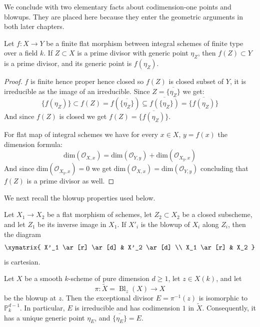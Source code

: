 We conclude with two elementary facts about codimension-one points and
blowups. They are placed here because they enter the geometric arguments in
both later chapters.

\begin{prop}\label{prop:finite_flat_prime_divisor}
Let $f:X\to Y$ be a finite flat morphism between integral schemes of finite
type over a field $k$. If $Z\subset X$ is a prime divisor with generic point
$\eta_Z$, then $f(Z)\subset Y$ is a prime divisor, and its generic point is
$f(\eta_Z)$.
\end{prop}

\begin{proof}
    $f$ is finite hence proper hence closed so $f(Z)$ is closed subset of $Y$, it is irreducible as the image of an irreducible.
    Since $Z = \overline{\{ \eta_Z \}}$ we get:
    $$\{f(\eta_Z)\} \subset f(Z) = f(\overline{\{\eta_Z\}}) \subseteq \overline{f(\{\eta_Z\})} = \overline{\{f(\eta_Z)\}}$$
    And since $f(Z)$ is closed we get $f(Z) = \overline{\{f(\eta_Z)\}}$.

    For flat map of integral schemes we have for every $x \in X$, $y=f(x)$ the dimension formula:
    $$\text{dim}(\mathcal{O}_{X,x}) = \text{dim}(\mathcal{O}_{Y,y}) + \text{dim}(\mathcal{O}_{X_y, x})$$
    And since $\text{dim}(\mathcal{O}_{X_y, x}) = 0$ we get $\text{dim}(\mathcal{O}_{X,x}) = \text{dim}(\mathcal{O}_{Y,y})$
    concluding that $f(Z)$ is a prime divisor as well.
\end{proof}

We next recall the blowup properties used below.

\begin{theorem}[\stackstag{0805}]\label{theorem:blowup_flat_base_change}
Let $X_1\to X_2$ be a flat morphism of schemes, let $Z_2\subset X_2$ be a
closed subscheme, and let $Z_1$ be its inverse image in $X_1$. If $X'_i$ is
the blowup of $X_i$ along $Z_i$, then the diagram
\[
\xymatrix{
X'_1 \ar[r] \ar[d] & X'_2 \ar[d] \\
X_1 \ar[r] & X_2
}
\]
is cartesian.
\end{theorem}

\begin{prop}\label{prop:exceptional_divisor_smooth_point}
Let $X$ be a smooth $k$-scheme of pure dimension $d\geq 1$, let $z\in X(k)$, and
let
\[
\pi:\widetilde X=\operatorname{Bl}_z(X)\longrightarrow X
\]
be the blowup at $z$. Then the exceptional divisor
$E=\pi^{-1}(z)$ is isomorphic to $\mathbb P_k^{d-1}$. In particular, $E$ is
irreducible and has codimension $1$ in $\widetilde X$. Consequently, it has
a unique generic point $\eta_E$, and $\overline{\{\eta_E\}}=E$.
\end{prop}

